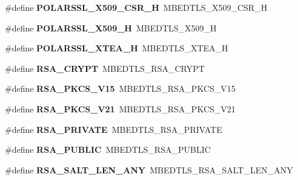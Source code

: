 \begin{DoxyCompactItemize}
\item 
\mbox{\label{compat-1_83_8h_a991cbfa69bc88785029b283b45ee984d}} 
\#define {\bfseries P\+O\+L\+A\+R\+S\+S\+L\+\_\+\+X509\+\_\+\+C\+S\+R\+\_\+H}~M\+B\+E\+D\+T\+L\+S\+\_\+\+X509\+\_\+\+C\+S\+R\+\_\+H
\item 
\mbox{\label{compat-1_83_8h_ab280b60777ba7e5b734cf02d59343c4e}} 
\#define {\bfseries P\+O\+L\+A\+R\+S\+S\+L\+\_\+\+X509\+\_\+H}~M\+B\+E\+D\+T\+L\+S\+\_\+\+X509\+\_\+H
\item 
\mbox{\label{compat-1_83_8h_ac070ed1f6a3d9970a508b1fef9d643fe}} 
\#define {\bfseries P\+O\+L\+A\+R\+S\+S\+L\+\_\+\+X\+T\+E\+A\+\_\+H}~M\+B\+E\+D\+T\+L\+S\+\_\+\+X\+T\+E\+A\+\_\+H
\item 
\mbox{\label{compat-1_83_8h_afdeb08b89f455b4c80a8283a1559b97d}} 
\#define {\bfseries R\+S\+A\+\_\+\+C\+R\+Y\+PT}~M\+B\+E\+D\+T\+L\+S\+\_\+\+R\+S\+A\+\_\+\+C\+R\+Y\+PT
\item 
\mbox{\label{compat-1_83_8h_acc924b6d08c92a2252fbab6c6ca5860e}} 
\#define {\bfseries R\+S\+A\+\_\+\+P\+K\+C\+S\+\_\+\+V15}~M\+B\+E\+D\+T\+L\+S\+\_\+\+R\+S\+A\+\_\+\+P\+K\+C\+S\+\_\+\+V15
\item 
\mbox{\label{compat-1_83_8h_ade2521c3c28b0f5b222fdef75f9f87e9}} 
\#define {\bfseries R\+S\+A\+\_\+\+P\+K\+C\+S\+\_\+\+V21}~M\+B\+E\+D\+T\+L\+S\+\_\+\+R\+S\+A\+\_\+\+P\+K\+C\+S\+\_\+\+V21
\item 
\mbox{\label{compat-1_83_8h_aeaabdd3bae85e564beb1ae9843169eb9}} 
\#define {\bfseries R\+S\+A\+\_\+\+P\+R\+I\+V\+A\+TE}~M\+B\+E\+D\+T\+L\+S\+\_\+\+R\+S\+A\+\_\+\+P\+R\+I\+V\+A\+TE
\item 
\mbox{\label{compat-1_83_8h_a1f00bab389d3db27a115db74e32be727}} 
\#define {\bfseries R\+S\+A\+\_\+\+P\+U\+B\+L\+IC}~M\+B\+E\+D\+T\+L\+S\+\_\+\+R\+S\+A\+\_\+\+P\+U\+B\+L\+IC
\item 
\mbox{\label{compat-1_83_8h_a6361445cef26eba64992ea54ecb90a47}} 
\#define {\bfseries R\+S\+A\+\_\+\+S\+A\+L\+T\+\_\+\+L\+E\+N\+\_\+\+A\+NY}~M\+B\+E\+D\+T\+L\+S\+\_\+\+R\+S\+A\+\_\+\+S\+A\+L\+T\+\_\+\+L\+E\+N\+\_\+\+A\+NY

\end{DoxyCompactItemize}
